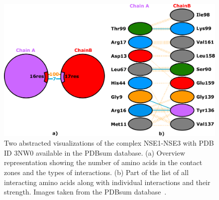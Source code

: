 \documentclass{bmcart}
\begin{document}
\begin{backmatter}
\begin{figure}[h!]
  \centering	
  \includegraphics[width=\columnwidth]{images/figure2.pdf}
  \caption{
    Two abstracted visualizations of the complex NSE1-NSE3 with PDB ID 3NW0 available in the PDBsum database. (a) Overview representation showing the number of amino acids in the contact zones and the types of interactions. (b) Part of the list of all interacting amino acids along with individual interactions and their strength. Images taken from the PDBsum database~\cite{pdbsum}.}
    \label{fig:pdbsum}
\end{figure}


\end{backmatter}
\end{document}

